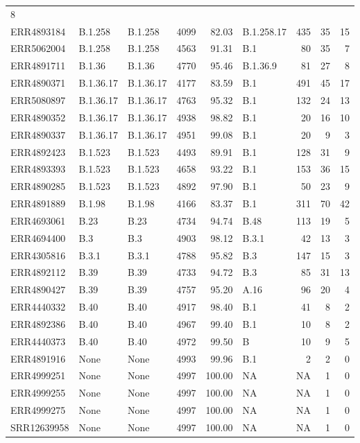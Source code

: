 \documentclass[
]{article}
\begin{document}
\begin{longtable}[]{@{}lllrrlrrr@{}}
8\tabularnewline
ERR4893184 & B.1.258 & B.1.258 & 4099 & 82.03 & B.1.258.17 & 435 & 35 &
15\tabularnewline
ERR5062004 & B.1.258 & B.1.258 & 4563 & 91.31 & B.1 & 80 & 35 &
7\tabularnewline
ERR4891711 & B.1.36 & B.1.36 & 4770 & 95.46 & B.1.36.9 & 81 & 27 &
8\tabularnewline
ERR4890371 & B.1.36.17 & B.1.36.17 & 4177 & 83.59 & B.1 & 491 & 45 &
17\tabularnewline
ERR5080897 & B.1.36.17 & B.1.36.17 & 4763 & 95.32 & B.1 & 132 & 24 &
13\tabularnewline
ERR4890352 & B.1.36.17 & B.1.36.17 & 4938 & 98.82 & B.1 & 20 & 16 &
10\tabularnewline
ERR4890337 & B.1.36.17 & B.1.36.17 & 4951 & 99.08 & B.1 & 20 & 9 &
3\tabularnewline
ERR4892423 & B.1.523 & B.1.523 & 4493 & 89.91 & B.1 & 128 & 31 &
9\tabularnewline
ERR4893393 & B.1.523 & B.1.523 & 4658 & 93.22 & B.1 & 153 & 36 &
15\tabularnewline
ERR4890285 & B.1.523 & B.1.523 & 4892 & 97.90 & B.1 & 50 & 23 &
9\tabularnewline
ERR4891889 & B.1.98 & B.1.98 & 4166 & 83.37 & B.1 & 311 & 70 &
42\tabularnewline
ERR4693061 & B.23 & B.23 & 4734 & 94.74 & B.48 & 113 & 19 &
5\tabularnewline
ERR4694400 & B.3 & B.3 & 4903 & 98.12 & B.3.1 & 42 & 13 &
3\tabularnewline
ERR4305816 & B.3.1 & B.3.1 & 4788 & 95.82 & B.3 & 147 & 15 &
3\tabularnewline
ERR4892112 & B.39 & B.39 & 4733 & 94.72 & B.3 & 85 & 31 &
13\tabularnewline
ERR4890427 & B.39 & B.39 & 4757 & 95.20 & A.16 & 96 & 20 &
4\tabularnewline
ERR4440332 & B.40 & B.40 & 4917 & 98.40 & B.1 & 41 & 8 &
2\tabularnewline
ERR4892386 & B.40 & B.40 & 4967 & 99.40 & B.1 & 10 & 8 &
2\tabularnewline
ERR4440373 & B.40 & B.40 & 4972 & 99.50 & B & 10 & 9 & 5\tabularnewline
ERR4891916 & None & None & 4993 & 99.96 & B.1 & 2 & 2 & 0\tabularnewline
ERR4999251 & None & None & 4997 & 100.00 & NA & NA & 1 &
0\tabularnewline
ERR4999255 & None & None & 4997 & 100.00 & NA & NA & 1 &
0\tabularnewline
ERR4999275 & None & None & 4997 & 100.00 & NA & NA & 1 &
0\tabularnewline
SRR12639958 & None & None & 4997 & 100.00 & NA & NA & 1 &
0\tabularnewline
\bottomrule
\end{longtable}

\normalsize

\renewcommand\refname{Bibliography}
  
\end{document}
